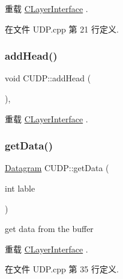 重载 \hyperlink{class_c_layer_interface_ac38c51660960657ac42e37a19ea062b4}{C\+Layer\+Interface} .



在文件 U\+D\+P.\+cpp 第 21 行定义.

\mbox{\label{class_c_u_d_p_a445c3b7fe1b58e8b278115649ad25c3f}} 
\subsubsection{\texorpdfstring{add\+Head()}{addHead()}\hspace{0.1cm}{\footnotesize\ttfamily [2/2]}}
{\footnotesize\ttfamily void C\+U\+D\+P\+::add\+Head (\begin{DoxyParamCaption}{ }\end{DoxyParamCaption})\hspace{0.3cm}{\ttfamily [protected]}, {\ttfamily [virtual]}}



重载 \hyperlink{class_c_layer_interface_ac38c51660960657ac42e37a19ea062b4}{C\+Layer\+Interface} .

\mbox{\label{class_c_u_d_p_aa71e49c760769b55dc2251b244eb00ff}} 
\subsubsection{\texorpdfstring{get\+Data()}{getData()}}
{\footnotesize\ttfamily \hyperlink{class_datagram}{Datagram} C\+U\+D\+P\+::get\+Data (\begin{DoxyParamCaption}\item[{int}]{lable }\end{DoxyParamCaption})\hspace{0.3cm}{\ttfamily [virtual]}}

get data from the buffer 

重载 \hyperlink{class_c_layer_interface_a804d604d3e0032e676d02fd5d369607e}{C\+Layer\+Interface} .



在文件 U\+D\+P.\+cpp 第 35 行定义.

\mbox{\label{class_c_u_d_p_a08619144028e752736166988369598c4}} 
